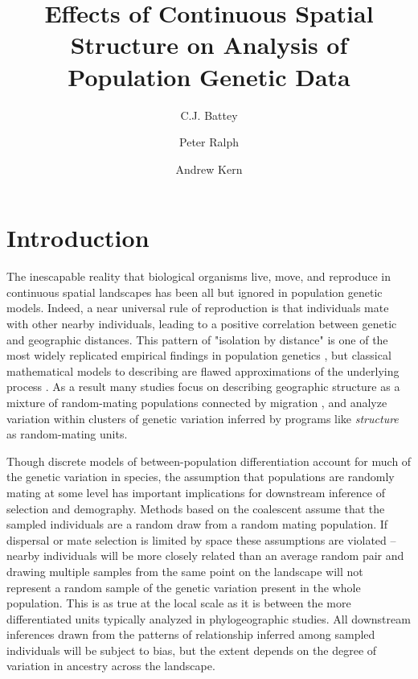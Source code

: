 \documentclass[9pt,twocolumn,twoside,lineno]{gsajnl}
\title{Effects of Continuous Spatial Structure on Analysis of Population Genetic Data}
\author[$\ast$,1]{C.J. Battey}
\author[$\ast$]{Peter Ralph}
\author[$\ast$]{Andrew Kern}
\affil[$\ast$]{University of Oregon Dept. Biology, Institute for Ecology Evolution}
\begin{document}
\maketitle
\thispagestyle{firststyle}
\marginmark
\firstpagefootnote


\vspace{-35pt}%

\section{Introduction}
The inescapable reality that biological organisms live, move, and reproduce in continuous spatial landscapes has been all but ignored in population genetic models. Indeed, a near universal rule of reproduction is that individuals mate with other nearby individuals, leading to a positive correlation between genetic and geographic distances. This pattern of "isolation by distance" \citep{Wright1943} is one of the most widely replicated empirical findings in population genetics \citep{Chen2017,Jay2012,Sharbel2000}, but classical mathematical models to describing are flawed approximations of the underlying process \citep{Felsenstein1975}.
As a result many studies focus on describing geographic structure as a mixture of random-mating populations connected by migration \citep{Malecot1948,Wright1931}, and analyze variation within clusters of genetic variation inferred by programs like \textit{structure} \citep{Pritchard2000} as random-mating units. 

Though discrete models of between-population differentiation account for much of the genetic variation in species, the assumption that populations are randomly mating at some level has important implications for downstream inference of selection and demography. Methods based on the coalescent \citep{Kingman1982} assume that the sampled individuals are a random draw from a random mating population. If dispersal or mate selection is limited by space these assumptions are violated -- nearby individuals will be more closely related than an average random pair and drawing multiple samples from the same point on the landscape will not represent a random sample of the genetic variation present in the whole population. This is as true at the local scale as it is between the more differentiated units typically analyzed in phylogeographic studies. All downstream inferences drawn from the patterns of relationship inferred among sampled individuals will be subject to bias, but the extent depends on the degree of variation in ancestry across the landscape. 
\end{document}
